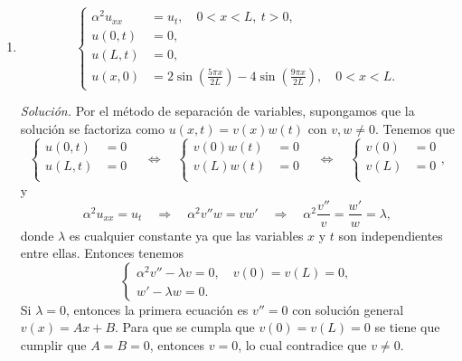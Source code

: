 \documentclass[12pt]{article}
\newcommand{\sol}{\textit{Solución. }}
\newcommand{\pp}[1]{\left( #1 \right)}
\newcommand{\Imp}{\quad\Longrightarrow\quad}
\newcommand{\Ssi}{\quad\Longleftrightarrow\quad}
\renewcommand{\l}{\lambda}
\renewcommand{\a}{\alpha}
\begin{document}
\begin{enumerate}
\begin{enumerate}
            \item \[
            \begin{cases}
                \a^2u_{xx} &= u_t,\quad 0<x<L,~t>0,\\
                u(0,t) &= 0,\\
                u(L,t) &= 0,\\
                u(x,0) &= 2\sin\pp{\tfrac{5\pi x}{2L}}-4\sin\pp{\tfrac{9\pi x}{2L}},\quad 0<x<L.
            \end{cases}
            \]

            \sol Por el método de separación de variables, supongamos que la solución se factoriza como $u(x,t)=v(x)w(t)$ con $v,w\neq 0$. Tenemos que
            \[
            \begin{cases}
                u(0,t) &= 0\\
                u(L,t) &= 0\\
            \end{cases}
            \Ssi
            \begin{cases}
                v(0)w(t) &= 0\\
                v(L)w(t) &= 0\\
            \end{cases}
            \Ssi
            \begin{cases}
                v(0) &= 0\\
                v(L) &= 0\\
            \end{cases},
            \]
            y
            \[ \a^2u_{xx} = u_t\Imp \a^2 v''w = vw'\Imp \a^2 \frac{v''}{v} = \frac{w'}{w}=\l,\]
            donde $\l$ es cualquier constante ya que las variables $x$ y $t$ son independientes entre ellas. Entonces tenemos 
            \[
            \begin{cases}
                \a^2v''-\l v=0,\quad v(0)=v(L)=0,\\
                w'-\l w=0.
            \end{cases}
            \]
            Si $\l=0$, entonces la primera ecuación es $v''=0$ con solución general $v(x)=Ax+B$. Para que se cumpla que $v(0)=v(L)=0$ se tiene que cumplir que $A=B=0$, entonces $v=0$, lo cual contradice que $v\neq 0$.
            

\end{enumerate}
\end{enumerate}
\end{document}
